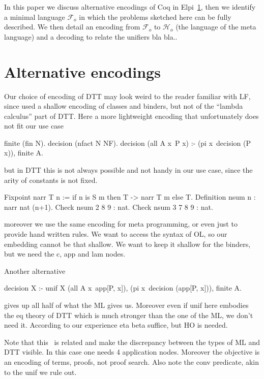 \documentclass[sigconf,natbib=false]{acmart}
\newcommand{\Fo}{\ensuremath{\mathcal{F}_{\!o}}}
\newcommand{\Ho}{\ensuremath{\mathcal{H}_o}}
\begin{document}
In this paper we discuss alternative encodings of Coq in
Elpi~\ref{sec:encodings}, then we identify a minimal language \Fo{}
in which the problems sketched here can be fully described.
We then detail an encoding  from \Fo{} to \Ho{} (the language of
the meta language) and a decoding  to relate the unifiers
bla bla..

\section{Alternative encodings} %
\label{sec:encodings}

Our choice of encoding of DTT may look weird to the reader familiar with
LF, since used a shallow encoding of classes and binders, but not of the
``lambda calculus'' part of DTT. Here a more lightweight encoding
that unfortunately does not fit our use case

\begin{elpicode}
finite (fin N).
decision (nfact N NF).
decision (all A x\ P x) :- 
  (pi x\ decision (P x)), finite A.
\end{elpicode}

but in DTT this is not always possible and not handy in our use case,
since the arity of constants is not fixed.

\begin{coqcode}
Fixpoint narr T n := 
  if n is S m then T -> narr T m else T.
Definition nsum n : narr nat (n+1).
Check nsum 2   8 9 : nat.
Check nsum 3 7 8 9 : nat.
\end{coqcode}
  
moreover we use the same encoding for meta programming, or even just to provide
hand written rules. We want to access the syntax of OL, so our embedding cannot
be that shallow. We want to keep it shallow for the binders, but we need
the c, app and lam nodes. %

Another alternative

\begin{elpicode}
decision X :- unif X (all A x\ app[P, x]), 
  (pi x\ decision (app[P, x])), finite A.
\end{elpicode}

gives up all half of what the ML gives us. Moreover even if unif here embodies
the eq theory of DTT which is much stronger than the one of the ML, we don't need 
it. According to our experience eta beta suffice, but HO is needed.



Note that this~\cite{felty93lics} is related and make the
discrepancy between the types of ML and DTT visible. In this case
one needs 4 application nodes. Moreover the objective is an encoding
of terms, proofs, not proof search. Also note the conv predicate,
akin to the unif we rule out.
\end{document}
